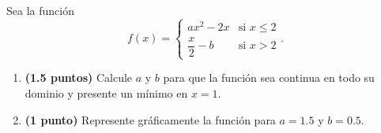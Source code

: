 
Sea la función
\[
f(x)=\begin{cases}
ax^2-2x&\text{si }x\leq2\\[0.5em]
\dfrac{x}{2}-b&\text{si }x>2
\end{cases}.
\]
\begin{enumerate}[label=\alph*)]
\item \textbf{(1.5 puntos)} Calcule $a$ y $b$ para que la función sea continua en todo su dominio y presente un mínimo en $x=1$.
\item \textbf{(1 punto)} Represente gráficamente la función para $a=1.5$ y $b=0.5$.
\end{enumerate}
